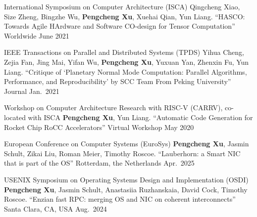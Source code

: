 \begin{cventries}
  \cventry
    {International Symposium on Computer Architecture (ISCA)}
    {{\normalfont Qingcheng Xiao, Size Zheng, Bingzhe Wu, \textbf{Pengcheng Xu}, Xuehai Qian, Yun Liang. ``HASCO: Towards Agile HArdware and Software CO-design for Tensor Computation''}}
    {Worldwide} %
    {June 2021} %
    {}

  \cventry
    {IEEE Transactions on Parallel and Distributed Systems (TPDS)}
    {{\normalfont Yihua Cheng, Zejia Fan, Jing Mai, Yifan Wu, \textbf{Pengcheng Xu}, Yuxuan Yan, Zhenxin Fu, Yun Liang. ``Critique of `Planetary Normal Mode Computation: Parallel Algorithms, Performance, and Reproducibility' by SCC Team From Peking University''}}
    {Journal} %
    {Jan.\ 2021} %
    {}

  \cventry
    {Workshop on Computer Architecture Research with RISC-V (CARRV), co-located with ISCA} %
    {{\normalfont \textbf{Pengcheng Xu}, Yun Liang. ``Automatic Code Generation for Rocket Chip RoCC Accelerators''}} %
    {Virtual Workshop} %
    {May 2020} %
    {}
\end{cventries}

\begin{cventries}

  \cventry
    {European Conference on Computer Systems (EuroSys)}
    {{\normalfont \textbf{Pengcheng Xu}, Jasmin Schult, Zikai Liu, Roman Meier, Timothy Roscoe. ``Lauberhorn: a Smart NIC that is part of the OS''}}
    {Rotterdam, the Netherlands} %
    {Apr.\ 2025} %
    {}

  \cventry
    {USENIX Symposium on Operating Systems Design and Implementation (OSDI)}
    {{\normalfont \textbf{Pengcheng Xu}, Jasmin Schult, Anastasiia Ruzhanskaia, David Cock, Timothy Roscoe. ``Enzian fast RPC: merging OS and NIC on coherent interconnects''}}
    {Santa Clara, CA, USA} %
    {Aug.\ 2024} %
    {}

\end{cventries}
